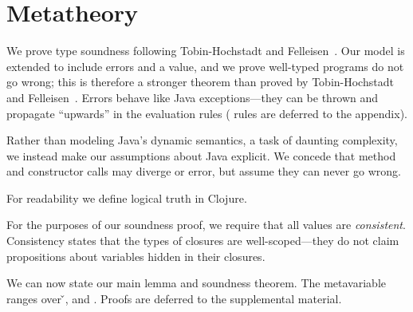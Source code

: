 \chapter{Metatheory}
\label{sec:metatheory}

We prove type soundness following Tobin-Hochstadt and Felleisen~\cite{TF10}.  Our model is extended
to include errors \errorvalv{} and a \wrong{} value, and we prove well-typed
programs do not go wrong; this is therefore a stronger theorem than
proved by Tobin-Hochstadt and Felleisen~\cite{TF10}. 
Errors behave like Java exceptions---they can be thrown and propagate ``upwards'' in the evaluation rules
(\errorvalv{} rules are deferred to the appendix).

Rather than modeling Java's dynamic semantics, a task of daunting
complexity, we instead make our assumptions about Java explicit. We
concede that method and constructor calls may diverge or error, but
assume they can never go wrong.

{}

For readability we define logical truth in Clojure.

{}

For the purposes of our soundness proof, we require that all values
are \emph{consistent}.  Consistency 
states that the types of closures are well-scoped---they do
not claim propositions about variables hidden in their closures.

{}

We can now state our main lemma and soundness theorem.  The
metavariable  ranges over \v{}, \errorvalv{} and
\wrong{}. Proofs are deferred to the supplemental material. %

\begin{lemma}\label{main:lemma:soundness}

  {\soundnesslemmahypothesis}
\end{lemma}


{}

{}

